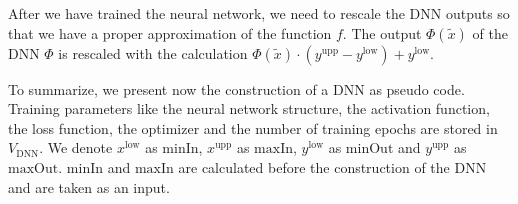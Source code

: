 After we have trained the neural network, we need to rescale the DNN outputs so that we have a proper approximation of the function $f$. The output $\Phi(\tilde{x})$ of the DNN $\Phi$ is rescaled with the calculation $\Phi(\tilde{x})\cdot(y^\mathrm{upp}-y^\mathrm{low})+y^\mathrm{low}$.

To summarize, we present now the construction of a DNN as pseudo code. Training parameters like the neural network structure, the activation function, the loss function, the optimizer and the number of training epochs are stored in $V_\mathrm{DNN}$. We denote $x^\mathrm{low}$ as $\mathrm{minIn}$, $x^\mathrm{upp}$ as $\mathrm{maxIn}$, $y^\mathrm{low}$ as $\mathrm{minOut}$ and $y^\mathrm{upp}$ as $\mathrm{maxOut}$. $\mathrm{minIn}$ and $\mathrm{maxIn}$ are calculated before the construction of the DNN and are taken as an input.

